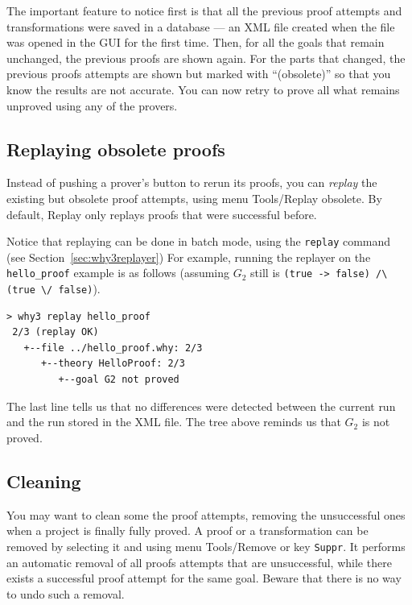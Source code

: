 The important feature to notice first is that all the previous proof
attempts and transformations were saved in a database --- an XML file
created when the \why file was opened in the GUI for the first
time. Then, for all the goals that remain unchanged, the previous
proofs are shown again. For the parts that changed, the previous
proofs attempts are shown but marked with ``(obsolete)''
so that you
know the results are not accurate. You can now retry to prove all what
remains unproved using any of the provers.

\subsection{Replaying obsolete proofs}

Instead of pushing a prover's button to rerun its proofs, you can
\emph{replay} the existing but obsolete
proof attempts, using menu
\textsf{Tools/Replay obsolete}. By default, \textsf{Replay} only replays
proofs that were successful before.

Notice that replaying can be done in batch mode, using the
\texttt{replay} command (see Section~\ref{sec:why3replayer}) For
example, running the replayer on the \texttt{hello\_proof} example is
as follows (assuming $G_2$ still is
\lstinline|(true -> false) /\ (true \/ false)|).
\begin{verbatim}
> why3 replay hello_proof
 2/3 (replay OK)
   +--file ../hello_proof.why: 2/3
      +--theory HelloProof: 2/3
         +--goal G2 not proved
\end{verbatim}
The last line tells us that no differences were detected between the
current run and the run stored in the XML file. The tree above
reminds us that $G_2$ is not proved.

\subsection{Cleaning}

You may want to clean some the proof attempts, \eg removing the
unsuccessful ones when a project is finally fully proved.
A proof or a transformation can be removed by selecting it and
using menu \textsf{Tools/Remove} or key \texttt{Suppr}.
It performs an automatic removal of all proofs
attempts that are unsuccessful, while there exists a successful proof
attempt for the same goal.
Beware that there is no way to undo such a removal.

